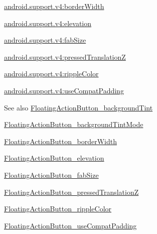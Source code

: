 {\ttfamily \hyperlink{classandroid_1_1support_1_1v4_1_1R_1_1styleable_acfbadae3c3154a5b70a3e70615553f1c}{android.\+support.\+v4\+:border\+Width}}

{\ttfamily \hyperlink{classandroid_1_1support_1_1v4_1_1R_1_1styleable_a9d53e5c6b5c18f38915b509ebada1d58}{android.\+support.\+v4\+:elevation}}

{\ttfamily \hyperlink{classandroid_1_1support_1_1v4_1_1R_1_1styleable_aa59e0b00cd1893f6504e167cb1003ffd}{android.\+support.\+v4\+:fab\+Size}}

{\ttfamily \hyperlink{classandroid_1_1support_1_1v4_1_1R_1_1styleable_a22d2414a00735c70b4e4b59e72e0fc1e}{android.\+support.\+v4\+:pressed\+TranslationZ}}

{\ttfamily \hyperlink{classandroid_1_1support_1_1v4_1_1R_1_1styleable_a13b7ea4854d33e1c561b1ec784145364}{android.\+support.\+v4\+:ripple\+Color}}

{\ttfamily \hyperlink{classandroid_1_1support_1_1v4_1_1R_1_1styleable_ac4a76f5791185c567f07299a6c3327e0}{android.\+support.\+v4\+:use\+Compat\+Padding}}

\begin{DoxySeeAlso}{See also}
\hyperlink{classandroid_1_1support_1_1v4_1_1R_1_1styleable_aeb7656d79670be2f4574c32fe5d56324}{Floating\+Action\+Button\+\_\+background\+Tint} 

\hyperlink{classandroid_1_1support_1_1v4_1_1R_1_1styleable_aee1803929827518ab119257a16d76e6d}{Floating\+Action\+Button\+\_\+background\+Tint\+Mode} 

\hyperlink{classandroid_1_1support_1_1v4_1_1R_1_1styleable_acfbadae3c3154a5b70a3e70615553f1c}{Floating\+Action\+Button\+\_\+border\+Width} 

\hyperlink{classandroid_1_1support_1_1v4_1_1R_1_1styleable_a9d53e5c6b5c18f38915b509ebada1d58}{Floating\+Action\+Button\+\_\+elevation} 

\hyperlink{classandroid_1_1support_1_1v4_1_1R_1_1styleable_aa59e0b00cd1893f6504e167cb1003ffd}{Floating\+Action\+Button\+\_\+fab\+Size} 

\hyperlink{classandroid_1_1support_1_1v4_1_1R_1_1styleable_a22d2414a00735c70b4e4b59e72e0fc1e}{Floating\+Action\+Button\+\_\+pressed\+TranslationZ} 

\hyperlink{classandroid_1_1support_1_1v4_1_1R_1_1styleable_a13b7ea4854d33e1c561b1ec784145364}{Floating\+Action\+Button\+\_\+ripple\+Color} 

\hyperlink{classandroid_1_1support_1_1v4_1_1R_1_1styleable_ac4a76f5791185c567f07299a6c3327e0}{Floating\+Action\+Button\+\_\+use\+Compat\+Padding} 
\end{DoxySeeAlso}
\mbox{\label{classandroid_1_1support_1_1v4_1_1R_1_1styleable_aeb7656d79670be2f4574c32fe5d56324}} 

